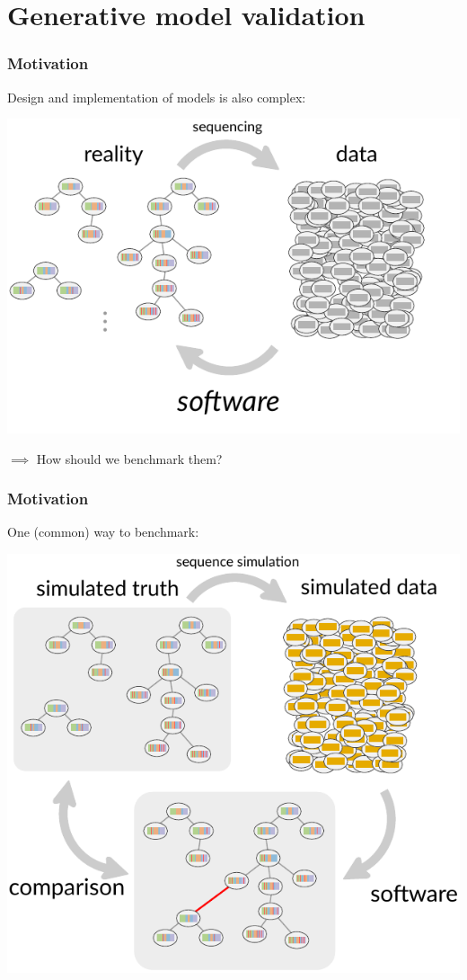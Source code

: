 \documentclass[mathserif,compress]{beamer}
\renewcommand\;{\,}
\begin{document}
\section{Generative model validation}

\begin{frame}\frametitle{Motivation}
Design and implementation of models is also complex:
\begin{center}
\includegraphics[width=0.8 \linewidth]{Images/bcell-mess-software.pdf}
\end{center}
$\implies$ How should we benchmark them?
\end{frame}

\begin{frame}\frametitle{Motivation}
One (common) way to benchmark: 
\begin{center}
\includegraphics[width=0.7\linewidth]{Images/bcell-mess-simulation.pdf}
\end{center}
\end{frame}
\end{document}

